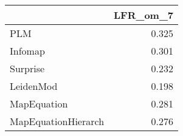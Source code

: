 \begin{tabular}{lr}
\toprule
{} & LFR_om_7 \\
\midrule
PLM                 &    0.325 \\
Infomap             &    0.301 \\
Surprise            &    0.232 \\
LeidenMod           &    0.198 \\
MapEquation         &    0.281 \\
MapEquationHierarch &    0.276 \\
\bottomrule
\end{tabular}

